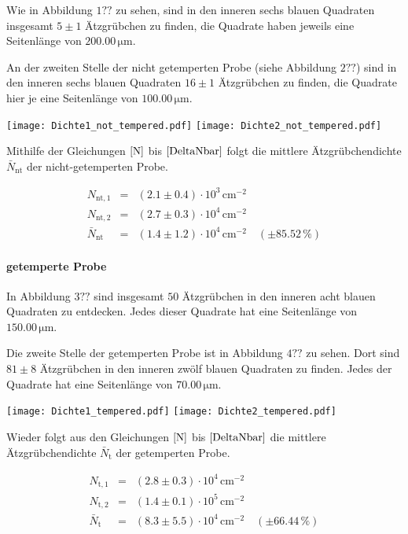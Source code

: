 \documentclass[12pt,a4paper]{scrartcl}
\numberwithin{equation}{section} %
\renewcommand{\[}{} %
\renewcommand{\]}{\noindent} %
\begin{document}
Wie in Abbildung \(1??\) zu sehen, sind in den inneren sechs blauen
Quadraten insgesamt \(5\pm1\) Ätzgrübchen zu finden, die Quadrate haben
jeweils eine Seitenlänge von \(200.00 \mathrm{\,\mu m}\).

An der zweiten Stelle der nicht getemperten Probe (siehe Abbildung
\(2??\)) sind in den inneren sechs blauen Quadraten \(16\pm1\)
Ätzgrübchen zu finden, die Quadrate hier je eine Seitenlänge von
\(100.00 \mathrm{\, \mu m}\).

\texttt{[image: Dichte1\_not\_tempered.pdf]}
\texttt{[image: Dichte2\_not\_tempered.pdf]}

Mithilfe der Gleichungen \(\eqref{N}\) bis \(\eqref{DeltaNbar}\) folgt
die mittlere Ätzgrübchendichte \(\bar N_\mathrm{nt}\) der
nicht-getemperten Probe.

\[
\begin{eqnarray}
    N_\mathrm{nt,1} &=& (2.1 \pm 0.4) \cdot 10^3 \mathrm{\, cm^{-2}} \\
    N_\mathrm{nt,2} &=& (2.7 \pm 0.3) \cdot 10^{4} \mathrm{\, cm^{-2}} \\
    \bar N_\mathrm{nt}
        &=& (1.4 \pm 1.2) \cdot 10^4 \mathrm{\, cm^{-2}}
        \quad(\pm 85.52\,\%)
\end{eqnarray}
\]

\hypertarget{getemperte-probe}{%
\paragraph{getemperte Probe}\label{getemperte-probe}}

In Abbildung \(3??\) sind insgesamt \(50\) Ätzgrübchen in den inneren
acht blauen Quadraten zu entdecken. Jedes dieser Quadrate hat eine
Seitenlänge von \(150.00 \mathrm{\, \mu m}\).

Die zweite Stelle der getemperten Probe ist in Abbildung \(4??\) zu
sehen. Dort sind \(81\pm8\) Ätzgrübchen in den inneren zwölf blauen
Quadraten zu finden. Jedes der Quadrate hat eine Seitenlänge von
\(70.00 \mathrm{\, \mu m}\).

\texttt{[image: Dichte1\_tempered.pdf]}
\texttt{[image: Dichte2\_tempered.pdf]}

Wieder folgt aus den Gleichungen \(\eqref{N}\) bis \(\eqref{DeltaNbar}\)
die mittlere Ätzgrübchendichte \(\bar N_\mathrm{t}\) der getemperten
Probe.

\[
\begin{eqnarray}
    N_\mathrm{t,1} &=& (2.8 \pm 0.3) \cdot 10^4 \mathrm{\, cm^{-2}} \\
    N_\mathrm{t,2} &=& (1.4 \pm 0.1) \cdot 10^5 \mathrm{\, cm^{-2}}
    \\
    \bar N_\mathrm{t}
        &=& (8.3 \pm 5.5) \cdot 10^4 \mathrm{\, cm^{-2}}
        \quad(\pm 66.44\,\%)
\end{eqnarray}
\]
\end{document}
